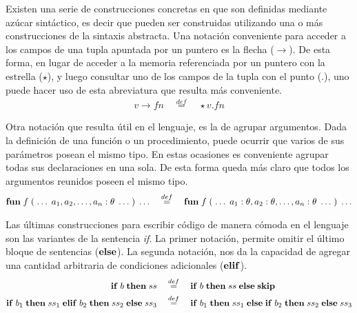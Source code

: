 Existen una serie de construcciones concretas en \Lenguaje{} que son definidas mediante azúcar sintáctico, es decir que pueden ser construidas utilizando una o más construcciones de la sintaxis abstracta.
Una notación conveniente para acceder a los campos de una tupla apuntada por un puntero es la flecha ($\rightarrow$).
De esta forma, en lugar de acceder a la memoria referenciada por un puntero con la estrella ($\star$), y luego consultar uno de los campos de la tupla con el punto ($.$), uno puede hacer uso de esta abreviatura que resulta más conveniente.
\begin{gather*}
v \rightarrow fn
\quad
\overset{def}{=}
\quad
\star v . fn
\end{gather*}

Otra notación que resulta útil en el lenguaje, es la de agrupar argumentos.
Dada la definición de una función o un procedimiento, puede ocurrir que varios de sus parámetros posean el mismo tipo.
En estas ocasiones es conveniente agrupar todas sus declaraciones en una sola.
De esta forma queda más claro que todos los argumentos reunidos poseen el mismo tipo.
\begin{gather*}
\mathbf{fun} \; f \; ( \; \ldots \; a_1, a_2, \ldots, a_n : \theta \; \ldots \; )
 \; \ldots
\quad
\overset{def}{=}
\quad
\mathbf{fun} \; f \; ( \; \ldots \; a_1 : \theta, a_2 : \theta, \ldots, a_n : \theta \; \ldots \; )
 \; \ldots
\end{gather*}

Las últimas construcciones para escribir código de manera cómoda en el lenguaje son las variantes de la sentencia \textit{if}.
La primer notación, permite omitir el último bloque de sentencias ($\mathbf{else}$).
La segunda notación, nos da la capacidad de agregar una cantidad arbitraria de condiciones adicionales ($\mathbf{elif}$).
\begin{align*}
\mathbf{if} \; b \; \mathbf{then} \; ss
\quad
&\overset{def}{=}
\quad
\mathbf{if} \; b \; \mathbf{then} \; ss \; \mathbf{else} \; \mathbf{skip}
\\
\mathbf{if} \; b_1 \; \mathbf{then} \; ss_1 \; \mathbf{elif} \; b_2 \; \mathbf{then} \; ss_2 \; \mathbf{else} \; ss_3
\quad
&\overset{def}{=}
\quad
\mathbf{if} \; b_1 \; \mathbf{then} \; ss_1 \; \mathbf{else} \; \mathbf{if} \; b_2 \; \mathbf{then} \; ss_2 \; \mathbf{else} \; ss_3
\end{align*}